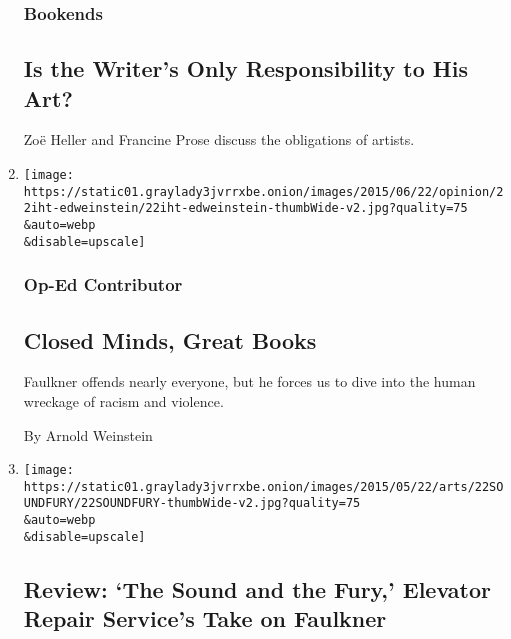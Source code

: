\begin{enumerate}
  \hypertarget{bookends-1}{%
  \subsubsection{Bookends}\label{bookends-1}}

  \hypertarget{is-the-writers-only-responsibility-to-his-art}{%
  \subsection{Is the Writer's Only Responsibility to His
  Art?}\label{is-the-writers-only-responsibility-to-his-art}}

  Zoë Heller and Francine Prose discuss the obligations of artists.
\item
  \href{/2015/06/22/opinion/closed-minds-great-books.html}{}

  \texttt{[image: https://static01.graylady3jvrrxbe.onion/images/2015/06/22/opinion/22iht-edweinstein/22iht-edweinstein-thumbWide-v2.jpg?quality=75\\\&auto=webp\\\&disable=upscale]}

  \hypertarget{op-ed-contributor}{%
  \subsubsection{Op-Ed Contributor}\label{op-ed-contributor}}

  \hypertarget{closed-minds-great-books}{%
  \subsection{Closed Minds, Great
  Books}\label{closed-minds-great-books}}

  Faulkner offends nearly everyone, but he forces us to dive into the
  human wreckage of racism and violence.

  By Arnold Weinstein
\item
  \href{/2015/05/22/theater/review-the-sound-and-the-fury-elevator-repair-services-take-on-faulkner.html}{}

  \texttt{[image: https://static01.graylady3jvrrxbe.onion/images/2015/05/22/arts/22SOUNDFURY/22SOUNDFURY-thumbWide-v2.jpg?quality=75\\\&auto=webp\\\&disable=upscale]}

  \hypertarget{review-the-sound-and-the-fury-elevator-repair-services-take-on-faulkner}{%
  \subsection{Review: `The Sound and the Fury,' Elevator Repair
  Service's Take on
  Faulkner}\label{review-the-sound-and-the-fury-elevator-repair-services-take-on-faulkner}}


\end{enumerate}
